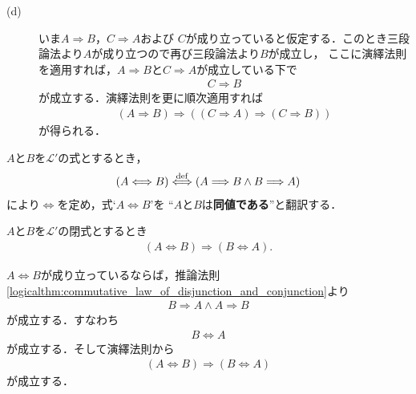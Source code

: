 \begin{prf}
\begin{description}
			\item[(d)]
				いま$A \Longrightarrow B$，$C \Longrightarrow A$および
				$C$が成り立っていると仮定する．このとき三段論法より$A$が成り立つので再び三段論法より$B$が成立し，
				ここに演繹法則を適用すれば，$A \Longrightarrow B$と$C \Longrightarrow A$が成立している下で
				\begin{align}
					C \Longrightarrow B
				\end{align}
				が成立する．演繹法則を更に順次適用すれば
				\begin{align}
					(A \Longrightarrow B) \Longrightarrow ( (C \Longrightarrow A) \Longrightarrow (C \Longrightarrow B) )
				\end{align}
				が得られる．
				\QED
		\end{description}
	\end{prf}
	
	$A$と$B$を$\mathcal{L}'$の式とするとき，
	\begin{align}
		(A \Longleftrightarrow B) \overset{\mathrm{def}}{\Longleftrightarrow}
		(A \Longrightarrow B \wedge B \Longrightarrow A)
	\end{align}
	により$\Longleftrightarrow$を定め，式`$A \Longleftrightarrow B$'を
	``$A$と$B$は{\bf 同値である}''と翻訳する．
	
	\begin{screen}
		\begin{logicalthm}[同値記号の可換律]\label{logicalthm:commutative_law_of_equivalence}
			$A$と$B$を$\mathcal{L}'$の閉式とするとき
			\begin{align}
				(A \Longleftrightarrow B) \Longrightarrow (B \Longleftrightarrow A).
			\end{align}
		\end{logicalthm}
	\end{screen}
	
	\begin{sketch}
		$A \Longleftrightarrow B$が成り立っているならば，推論法則\ref{logicalthm:commutative_law_of_disjunction_and_conjunction}より
		\begin{align}
			B \Longrightarrow A \wedge A \Longrightarrow B
		\end{align}
		が成立する．すなわち
		\begin{align}
			B \Longleftrightarrow A
		\end{align}
		が成立する．そして演繹法則から
		\begin{align}
			(A \Longleftrightarrow B) \Longrightarrow (B \Longleftrightarrow A)
		\end{align}
		が成立する．
		\QED
	\end{sketch}
	
